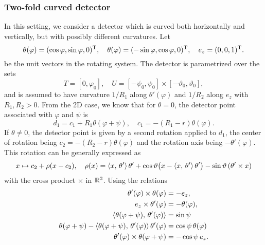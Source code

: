 \documentclass{amsart}
\renewcommand*{\phi}{\varphi}
\begin{document}
\vspace{5ex}%



\subsubsection{Two-fold curved detector}
\label{sec:applications:cone_circular:twofoldcurved}

In this setting, we consider a detector which is curved both horizontally and vertically, but with possibly different curvatures. Let
%
\begin{equation}
 \label{eq:conecurved:unitvecs}
 \theta(\phi) = \TRANSP{(\cos\phi, \sin\phi, 0)}, \quad \theta(\phi) = \TRANSP{(-\sin\phi, \cos\phi, 0)}, \quad e_z = \TRANSP{(0, 0, 1)}.
\end{equation}
%
be the unit vectors in the rotating system. The detector is parametrized over the sets
%
\begin{equation}
 \label{eq:conecurved:params}
 T = [0, \phi_0],\quad U = [-\psi_0, \psi_0] \times [-\vartheta_0, \vartheta_0],
\end{equation}
%
and is assumed to have curvature $1/R_1$ along $\theta'(\phi)$ and $1/R_2$ along $e_z$ with $R_1,R_2 >0$. From the 2D case, we know that 
for $\theta=0$, the detector point associated with $\phi$ and $\psi$ is
%
\begin{equation*}
 d_1 = c_1 + R_1 \theta(\phi + \psi), \quad c_1 = -(R_1 - r) \theta(\phi).
\end{equation*}
%
If $\theta \neq 0$, the detector point is given by a second rotation applied to $d_1$, the center of rotation being $c_2 = -(R_2 - r) 
\theta(\phi)$ and the rotation axis being $-\theta'(\phi)$. This rotation can be generally expressed as
%
\begin{equation*}
 x \mapsto c_2 + \rho(x - c_2), \quad \rho(x) = \langle x,\,\theta'\rangle\, \theta' + \cos\vartheta \big(x - \langle x,\,\theta'\rangle\, \theta'\big) 
 - \sin\vartheta\, (\theta' \times x)
\end{equation*}
%
with the cross product $\times$ in ${\mathbb{R}}^3$. Using the relations
%
\begin{align*}
 \theta'(\phi) \times \theta(\phi) &= -e_z, \\
 e_z \times \theta'(\phi) &= -\theta(\phi), \\
 \INNER{\theta(\phi + \psi)}{\theta'(\phi)} &= \sin\psi \\
 \theta(\phi + \psi) - \INNER{\theta(\phi + \psi)}{\theta'(\phi)}\, \theta'(\phi) &= \cos\psi\, \theta(\phi)\\
 \theta'(\phi) \times \theta(\phi + \psi) &= -\cos\psi\, e_z.
\end{align*}
\end{document}
